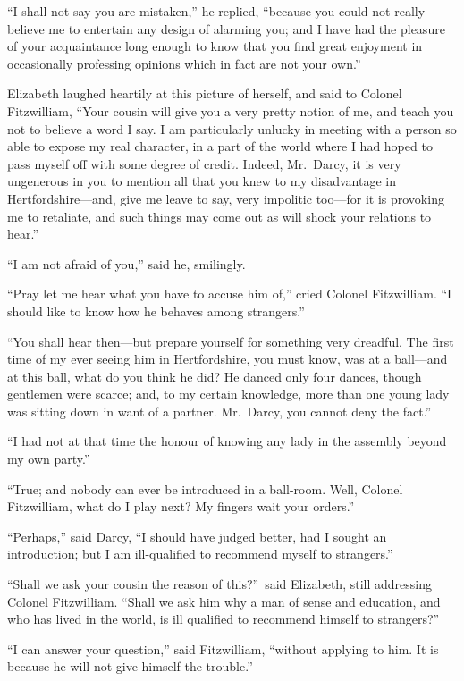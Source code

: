 \documentclass[12pt,english,oneside]{book}
\begin{document}
{}``I shall not say you are mistaken,'' he replied, {}``because
you could not really believe me to entertain any design of alarming
you; and I have had the pleasure of your acquaintance long enough
to know that you find great enjoyment in occasionally professing opinions
which in fact are not your own.''

Elizabeth laughed heartily at this picture of herself, and said to
Colonel Fitzwilliam, {}``Your cousin will give you a very pretty
notion of me, and teach you not to believe a word I say. I am particularly
unlucky in meeting with a person so able to expose my real character,
in a part of the world where I had hoped to pass myself off with some
degree of credit. Indeed, Mr.\ Darcy, it is very ungenerous in you
to mention all that you knew to my disadvantage in Hertfordshire\mbox{---}and,
give me leave to say, very impolitic too\mbox{---}for it is provoking
me to retaliate, and such things may come out as will shock your relations
to hear.''

{}``I am not afraid of you,'' said he, smilingly.

{}``Pray let me hear what you have to accuse him of,'' cried Colonel
Fitzwilliam. {}``I should like to know how he behaves among strangers.''

{}``You shall hear then\mbox{---}but prepare yourself for something
very dreadful. The first time of my ever seeing him in Hertfordshire,
you must know, was at a ball\mbox{---}and at this ball, what do you
think he did? He danced only four dances, though gentlemen were scarce;
and, to my certain knowledge, more than one young lady was sitting
down in want of a partner. Mr.\ Darcy, you cannot deny the fact.''

{}``I had not at that time the honour of knowing any lady in the
assembly beyond my own party.''

{}``True; and nobody can ever be introduced in a ball-room. Well,
Colonel Fitzwilliam, what do I play next? My fingers wait your orders.''

{}``Perhaps,'' said Darcy, {}``I should have judged better, had
I sought an introduction; but I am ill-qualified to recommend myself
to strangers.''

{}``Shall we ask your cousin the reason of this?''\ said Elizabeth,
still addressing Colonel Fitzwilliam. {}``Shall we ask him why a
man of sense and education, and who has lived in the world, is ill
qualified to recommend himself to strangers?''\ 

{}``I can answer your question,'' said Fitzwilliam, {}``without
applying to him. It is because he will not give himself the trouble.''
\end{document}
